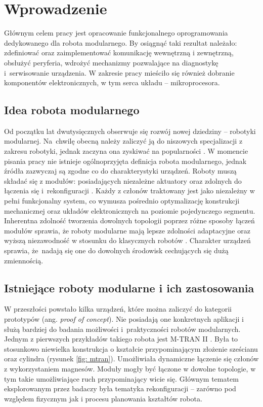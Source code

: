 \chapter{Wprowadzenie}
Głównym celem pracy jest opracowanie funkcjonalnego oprogramowania dedykowanego dla robota modularnego. By osiągnąć taki rezultat należało: zdefiniować oraz zaimplementować komunikację wewnętrzną i zewnętrzną, obsłużyć peryferia, wdrożyć mechanizmy pozwalające na diagnostykę i~serwisowanie urządzenia. W zakresie pracy mieściło się również dobranie komponentów elektronicznych, w tym serca układu -- mikroprocesora.

\section{Idea robota modularnego}
Od początku lat dwutysięcznych obserwuje się rozwój nowej dziedziny -- robotyki modularnej. Na~chwilę obecną należy zaliczyć ją do niszowych specjalizacji z zakresu robotyki, jednak zaczyna ona  zyskiwać na popularności \cite{state_art}. W momencie pisania pracy nie istnieje ogólnoprzyjęta definicja robota modularnego, jednak źródła zazwyczaj są zgodne co do charakterystyki urządzeń. Roboty muszą składać się z modułów: posiadających niezależne aktuatory oraz zdolnych do łączenia się i~rekonfiguracji \cite{modular_robots_theory, liu2009, state_art}. Każdy z członów traktowany jest jako niezależny w pełni funkcjonalny system, co wymusza pośrednio optymalizację konstrukcji mechanicznej oraz układów elektronicznych na poziomie pojedynczego segmentu. Inherentna zdolność tworzenia dowolnych topologii poprzez różne sposoby łączeń modułów sprawia, że roboty modularne mają lepsze zdolności adaptacyjne oraz wyższą niezawodność w stosunku do klasycznych robotów \cite{state_art, yoshida2003, liu2009}. Charakter urządzeń sprawia, że~nadają się one do dowolnych środowisk cechujących się dużą zmiennością.

\section{Istniejące roboty modularne i ich zastosowania}
W przeszłości powstało kilka urządzeń, które można zaliczyć do kategorii prototypów (ang. \textit{proof of concept}). Nie posiadają one konkretnych aplikacji i służą bardziej do badania możliwości i~praktyczności robotów modularnych. Jednym z pierwszych przykładów takiego robota jest M-TRAN II \cite{mtran}. Była to stosunkowo niewielka konstrukcja o kształcie przypominającym złożenie sześcianu oraz cylindra (rysunek \ref{fig: mtran}). Umożliwiała dynamiczne łączenie się członów z wykorzystaniem magnesów. Moduły mogły być łączone w dowolne topologie, w tym takie umożliwiające ruch przypominający wicie się. Głównym tematem eksplorowanym przez badaczy była tematyka rekonfiguracji -- zarówno pod względem fizycznym jak i procesu planowania kształtów robota. 

